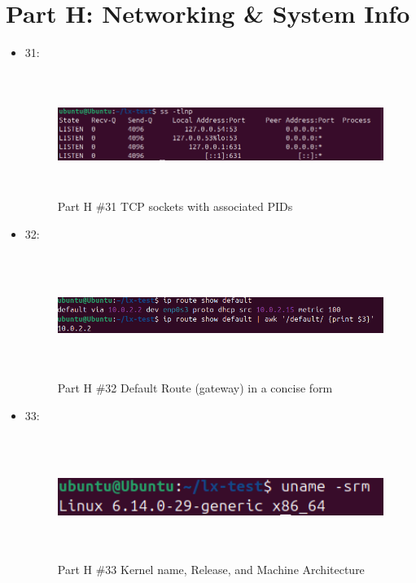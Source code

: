 \section{Part H: Networking \& System Info}
\begin{itemize}
    \item 31:
     \begin{figure}[H]
        \centering
        \includegraphics[width=15cm, height=4cm]{png/LinuxProblemSetPicsPNG/PartH31.png}
        \caption{Part H \#31 TCP sockets with associated PIDs }
        \label{fig:partH 31}
    \end{figure}
    
    \item 32: 
     \begin{figure}[H]
        \centering
        \includegraphics[width=15cm, height=4cm]{png/LinuxProblemSetPicsPNG/PartH32.png}
        \caption{Part H \#32 Default Route (gateway) in a concise form}
        \label{fig:partH 32}
    \end{figure}
    
    \item 33: 
     \begin{figure}[H]
        \centering
        \includegraphics[width=15cm, height=4cm]{png/LinuxProblemSetPicsPNG/PartH33.png}
        \caption{Part H \#33 Kernel name, Release, and Machine Architecture}
        \label{fig:partH 33}
    \end{figure}
    

\end{itemize}
